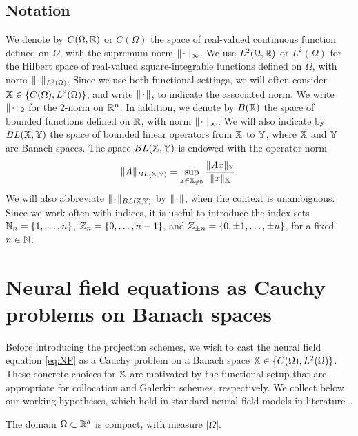 \documentclass[a4paper,baskervaldx]{daarticle}
\begin{document}
\subsection{Notation}
We denote by $C(\Omega,\mathbb{R})$ or $C(\Omega)$ the space of
real-valued continuous function defined on $\Omega$, with the supremum norm $\|
{\mkern 2mu\cdot\mkern 2mu} \|_\infty$. We use $L^2(\Omega,\mathbb{R})$ or $L^2(\Omega)$ for the
Hilbert space of real-valued square-integrable functions defined on $\Omega$, with
norm $\| {\mkern 2mu\cdot\mkern 2mu} \|_{L^2(\Omega)}$. Since we use both functional settings, we will
often consider $\mathbb{X} \in \{C(\Omega),L^2(\Omega)\}$, and write $\| {\mkern 2mu\cdot\mkern 2mu} \|$, to
indicate the associated norm. 
We write $\| {\mkern 2mu\cdot\mkern 2mu} \|_2$ for the $2$-norm on
$\mathbb{R}^n$. In addition, we denote by $B(\mathbb{R})$ the space of bounded functions
defined on $\mathbb{R}$, with norm $\| {\mkern 2mu\cdot\mkern 2mu} \|_\infty$.
%
We will also indicate by $BL(\mathbb{X},\mathbb{Y})$ the space of bounded linear operators from
$\mathbb{X}$ to $\mathbb{Y}$, where $\mathbb{X}$ and $\mathbb{Y}$ are Banach spaces. The space
$BL(\mathbb{X},\mathbb{Y})$ is endowed with the operator norm
\[
  \| A \|_{BL(\mathbb{X},\mathbb{Y})} = \sup_{x \in \mathbb{X}_{\neq 0}} \frac{\| A
  x\|_{\mathbb{Y}}}{\| x\|_{\mathbb{X}}}.
\]
We will also abbreviate $\| {\mkern 2mu\cdot\mkern 2mu} \|_{BL(\mathbb{X},\mathbb{Y})}$ by $\| {\mkern 2mu\cdot\mkern 2mu} \|$, when the
context is unambiguous.
%
Since we work often with indices, it is useful to introduce the index sets 
$\mathbb{N}_n = \{1, \ldots,n\}$, $\mathbb{Z}_{n}= \{0,\ldots,n-1\}$, and $\mathbb{Z}_{\pm n}
=\{0,\pm 1,\ldots,\pm n\}$, for a fixed $n \in \mathbb{N}$.


\section{Neural field equations as Cauchy problems on Banach spaces} 
\label{sec:prelim} Before introducing the projection schemes, we wish to cast the neural
field equation
\cref{eq:NF} as a Cauchy problem on a Banach space $\mathbb{X} \in \{C(\Omega),
L^2(\Omega)\}$. These concrete choices for $\mathbb{X}$ are motivated by the functional
setup that are appropriate for collocation and Galerkin schemes, respectively.
%
We collect below our working hypotheses, which hold in standard neural field
models in literature~\cite{Ermentrout.2010,Bressloff.2014k0p,coombes2014neural}.
\begin{hypothesis}[Cortex]\label{hyp:domain}
  The domain $\Omega \subset \mathbb{R}^d$ is compact,
  with measure $| \Omega |$.
\end{hypothesis}
 
\end{document}
